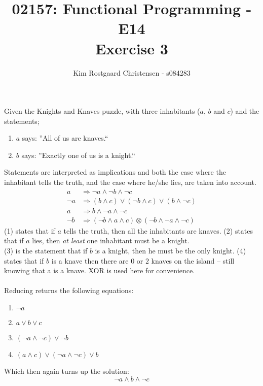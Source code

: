 \documentclass[10pt,a4paper]{article}
\author{Kim Rostgaard Christensen - s084283}
\title{02157: Functional Programming - E14 \\ Exercise 3}
\begin{document}
\maketitle
Given the Knights and Knaves puzzle, with three inhabitants ($a$, $b$ and $c$) and the statements;
 \begin{enumerate}
   \item $a$ says: ''All of us are knaves.``
   \item $b$ says: ''Exactly one of us is a knight.``
 \end{enumerate}
Statements are interpreted as implications and both the case where the inhabitant tells the truth, and the case where he/she lies, are taken into account.
 \begin{align}
   a &\Rightarrow \neg a \wedge \neg b \wedge \neg c\\
    \neg a &\Rightarrow \left( b \wedge c \right) \vee \left( \neg b \wedge c \right) \vee \left( b \wedge \neg c \right)\\
   a &\Rightarrow b \wedge \neg a \wedge \neg c\\
   \neg b &\Rightarrow \left( \neg b \wedge a \wedge c \right) \otimes \left( \neg b \wedge \neg a \wedge \neg c \right)
 \end{align}
(1) states that if $a$ tells the truth, then all the inhabitants are knaves. (2) states that if $a$ lies, then \emph{at least} one inhabitant must be a knight.\\ (3) is the statement that if $b$ is a knight, then he must be the only knight. (4) states that if $b$ is a knave then there are $0$ or $2$ knaves on the island -- still knowing that a is a knave. XOR is used here for convenience.\\\\
Reducing returns the following equations:
\begin{enumerate}
 \item $\neg a$
 \item $a \vee b \vee c $
 \item $\left(\neg a \wedge \neg c \right) \vee \neg b$
 \item $\left( a \wedge c \right) \vee \left(\neg a \wedge \neg c \right) \vee b$ 

\end{enumerate}
Which then again turns up the solution:
\begin{equation}
  \neg a \wedge b \wedge \neg c
\end{equation}
\end{document}
